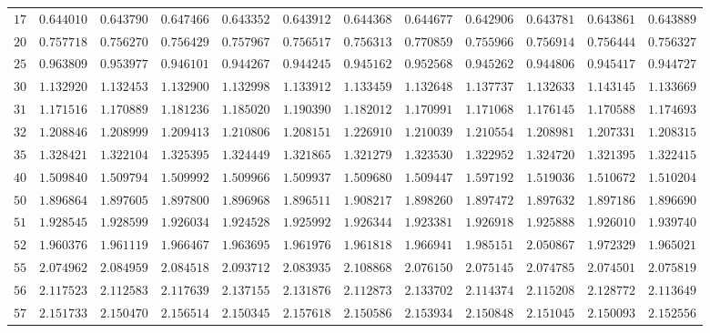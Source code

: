 \begin{sidewaystable}
\begin{tabular}{r|rrrrrrrrrrr}
$17$ & $0.644010$ & $0.643790$ & $0.647466$ & $0.643352$ & $0.643912$ & $0.644368$ & $0.644677$ & $0.642906$ & $0.643781$ & $0.643861$ & $0.643889$ \\
$20$ & $0.757718$ & $0.756270$ & $0.756429$ & $0.757967$ & $0.756517$ & $0.756313$ & $0.770859$ & $0.755966$ & $0.756914$ & $0.756444$ & $0.756327$ \\
$25$ & $0.963809$ & $0.953977$ & $0.946101$ & $0.944267$ & $0.944245$ & $0.945162$ & $0.952568$ & $0.945262$ & $0.944806$ & $0.945417$ & $0.944727$ \\
$30$ & $1.132920$ & $1.132453$ & $1.132900$ & $1.132998$ & $1.133912$ & $1.133459$ & $1.132648$ & $1.137737$ & $1.132633$ & $1.143145$ & $1.133669$ \\
$31$ & $1.171516$ & $1.170889$ & $1.181236$ & $1.185020$ & $1.190390$ & $1.182012$ & $1.170991$ & $1.171068$ & $1.176145$ & $1.170588$ & $1.174693$ \\
$32$ & $1.208846$ & $1.208999$ & $1.209413$ & $1.210806$ & $1.208151$ & $1.226910$ & $1.210039$ & $1.210554$ & $1.208981$ & $1.207331$ & $1.208315$ \\
$35$ & $1.328421$ & $1.322104$ & $1.325395$ & $1.324449$ & $1.321865$ & $1.321279$ & $1.323530$ & $1.322952$ & $1.324720$ & $1.321395$ & $1.322415$ \\
$40$ & $1.509840$ & $1.509794$ & $1.509992$ & $1.509966$ & $1.509937$ & $1.509680$ & $1.509447$ & $1.597192$ & $1.519036$ & $1.510672$ & $1.510204$ \\
$50$ & $1.896864$ & $1.897605$ & $1.897800$ & $1.896968$ & $1.896511$ & $1.908217$ & $1.898260$ & $1.897472$ & $1.897632$ & $1.897186$ & $1.896690$ \\
$51$ & $1.928545$ & $1.928599$ & $1.926034$ & $1.924528$ & $1.925992$ & $1.926344$ & $1.923381$ & $1.926918$ & $1.925888$ & $1.926010$ & $1.939740$ \\
$52$ & $1.960376$ & $1.961119$ & $1.966467$ & $1.963695$ & $1.961976$ & $1.961818$ & $1.966941$ & $1.985151$ & $2.050867$ & $1.972329$ & $1.965021$ \\
$55$ & $2.074962$ & $2.084959$ & $2.084518$ & $2.093712$ & $2.083935$ & $2.108868$ & $2.076150$ & $2.075145$ & $2.074785$ & $2.074501$ & $2.075819$ \\
$56$ & $2.117523$ & $2.112583$ & $2.117639$ & $2.137155$ & $2.131876$ & $2.112873$ & $2.133702$ & $2.114374$ & $2.115208$ & $2.128772$ & $2.113649$ \\
$57$ & $2.151733$ & $2.150470$ & $2.156514$ & $2.150345$ & $2.157618$ & $2.150586$ & $2.153934$ & $2.150848$ & $2.151045$ & $2.150093$ & $2.152556$ \\

\end{tabular}
\end{sidewaystable}
